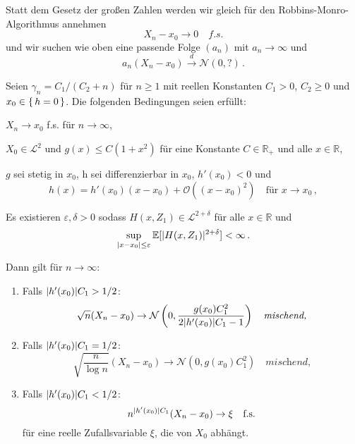 \documentclass[ngerman,a4paper,11pt]{scrartcl}
\newcommand{\EE}{\mathbb{E}}
\newcommand{\RR}{\mathbb{R}}
\renewcommand{\ll}{\mathcal{L}}
\newcommand{\nn}{\mathcal{N}}
\newcommand{\interv}{\RR}
\newcommand{\expect}[1]{\EE[#1]}
\DeclarePairedDelimiter{\abs}{\lvert}{\rvert}		%
\begin{document}
Statt dem Gesetz der großen Zahlen werden wir gleich für den
Robbins-Monro-Algorithmus annehmen
\begin{equation*}
 X_n-x_0\to 0\quad\textit{f.s.} 
\end{equation*}
und wir suchen wie oben eine passende Folge $(a_n)$ mit $a_n\to\infty$ und
\begin{equation*}
 a_n(X_n-x_0)\overset{d}{\to}\nn(0, ?)\,. 
\end{equation*}
\begin{thm}
 \label{thm:haupt}
 Seien $\gamma_n=C_1/(C_2+n)$ für $n\geq 1$ mit reellen Konstanten $C_1>0$,
 $C_2\geq 0$ und $x_0\in\set{h=0}$. Die folgenden Bedingungen seien erfüllt:
 \begin{thmasslist}
 \item $X_n\to x_0$ f.s. für $n\to\infty$,
 \item $X_0\in\ll^2$ und $g(x)\leq C(1+x^2)$ für eine Konstante $C\in\RR_+$ und
   alle $x\in \interv$,\label{thm:haupt:b}
 \item $g$ sei stetig in $x_0$, h sei differenzierbar in $x_0$, $h'(x_0)<0$ und\label{thm:haupt:c}
   \begin{equation*}
    h(x) = h'(x_0)(x-x_0) + \mathcal{O}((x-x_0)^2)\quad\text{für $x\to x_0$}\,,
   \end{equation*}
 \item Es existieren $\varepsilon,\delta >0$ sodass $H(x,Z_1)\in\ll^{2+\delta}$ für
   alle $x\in \interv$ und\label{thm:haupt:d} 
   \begin{equation*}
    \sup_{\abs{x-x_0}\leq\varepsilon}\expect{\abs{H(x,Z_1)}^{2+\delta}}<\infty\,.
   \end{equation*}
 \end{thmasslist}
 Dann gilt für $n\to\infty$:
 \begin{enumerate}[label=(\roman*)]
 \item Falls $\abs{h'(x_0)}C_1>1/2$:\label{thm:haupt:i}
   \begin{equation*}
    \sqrt{n}(X_n-x_0)\to\nn\left( 0,\frac{g(x_0)C_1^2}{2\abs{h'(x_0)}C_1-1} \right)\quad\textit{mischend,}
   \end{equation*}
 \item Falls $\abs{h'(x_0)}C_1=1/2$:
   \begin{equation*}
    \sqrt{\frac{n}{\log n}}(X_n-x_0)\to\nn\left( 0,g(x_0)C_1^2 \right)\quad\textit{mischend,}
   \end{equation*}
 \item Falls $\abs{h'(x_0)}C_1<1/2$: 
   \begin{equation*}
     n^{\abs{h'(x_0)}C_1}(X_n-x_0)\to\xi \quad\text{f.s.}
   \end{equation*}
   für eine reelle Zufallsvariable $\xi$, die von $X_0$ abhängt.
 \end{enumerate}
\end{thm}
\end{document}
